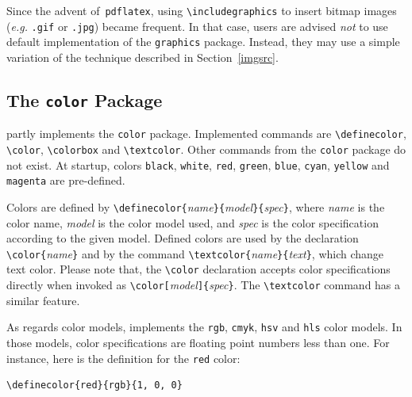 \fi
Since the advent of~\texttt{pdflatex},
using \verb+\includegraphics+ to insert bitmap images
(\emph{e.g.} \texttt{.gif} or \texttt{.jpg})
became frequent.
In that case, users are advised \emph{not} to use \hevea{} default
implementation of the \texttt{graphics} package.
Instead, they may use a simple variation of
the technique described in Section~\ref{imgsrc}.


\subsection{The \texttt{color} Package}%
\label{color}\label{color:package}%
\newcommand{\showcolor}[1]{\texttt{#1}}
\hevea{} partly implements the \texttt{color} package.
Implemented commands are \verb+\definecolor+, \verb+\color+,
\verb+\colorbox+ and
\verb+\textcolor+. Other commands from the \texttt{color} package do
not exist.
At startup,
colors \showcolor{black}, \showcolor{white},
\showcolor{red}, \showcolor{green}, \showcolor{blue},
\showcolor{cyan}, \showcolor{yellow} and \showcolor{magenta} are
pre-defined.

Colors are defined by
\verb+\definecolor{+\textit{name}\verb+}{+\textit{model}\verb+}{+\textit{spec}\verb+}+,
where \textit{name} is the color name, \textit{model} is the color
model used, and \textit{spec} is the color specification according to
the given model.
Defined colors are used by the declaration
\verb+\color{+\textit{name}\verb+}+ and by the command
\verb+\textcolor{+\textit{name}\verb+}{+\textit{text}\verb+}+, which
change text color.
Please note that, the \verb+\color+ declaration
accepts color specifications directly
when invoked as
\verb+\color[+\textit{model}\verb+]{+\textit{spec}\verb+}+.
The \verb+\textcolor+ command has a similar feature.

As regards color models, \hevea{} implements the \texttt{rgb},
\texttt{cmyk}, \texttt{hsv} and \texttt{hls} color models.
In those models, color specifications are floating point numbers less
than one.
For instance, here is the definition for the \texttt{red} color:
\begin{verbatim}
\definecolor{red}{rgb}{1, 0, 0}
\end{verbatim}


